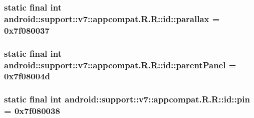 \hypertarget{classandroid_1_1support_1_1v7_1_1appcompat_1_1_r_1_1id_96afcf92d7c276a60efcc977795d55d1}{
\subsubsection[{parallax}]{\setlength{\rightskip}{0pt plus 5cm}static final int android::support::v7::appcompat.R.R::id::parallax = 0x7f080037}}
\label{classandroid_1_1support_1_1v7_1_1appcompat_1_1_r_1_1id_96afcf92d7c276a60efcc977795d55d1}


\hypertarget{classandroid_1_1support_1_1v7_1_1appcompat_1_1_r_1_1id_a35ef191868b4400c86f8a88dceffc64}{
\subsubsection[{parentPanel}]{\setlength{\rightskip}{0pt plus 5cm}static final int android::support::v7::appcompat.R.R::id::parentPanel = 0x7f08004d}}
\label{classandroid_1_1support_1_1v7_1_1appcompat_1_1_r_1_1id_a35ef191868b4400c86f8a88dceffc64}


\hypertarget{classandroid_1_1support_1_1v7_1_1appcompat_1_1_r_1_1id_fd4c6b3c14261cf54c5e8ba319a3baf6}{
\subsubsection[{pin}]{\setlength{\rightskip}{0pt plus 5cm}static final int android::support::v7::appcompat.R.R::id::pin = 0x7f080038}}
\label{classandroid_1_1support_1_1v7_1_1appcompat_1_1_r_1_1id_fd4c6b3c14261cf54c5e8ba319a3baf6}


